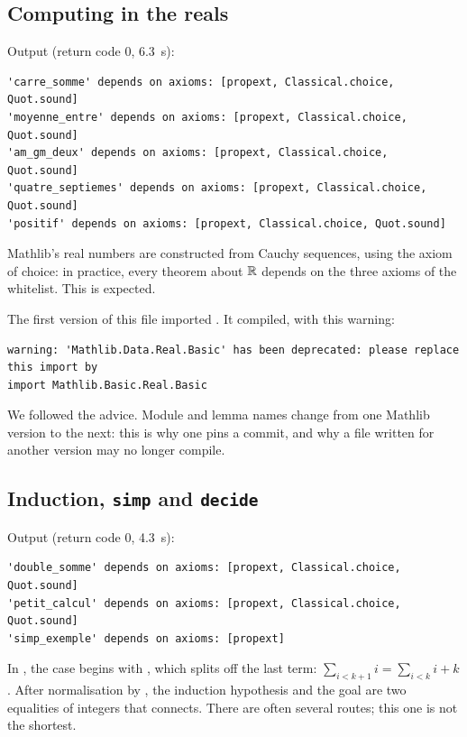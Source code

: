 \subsection{Computing in the reals}

\noindent Output (return code $0$, 6.3~s):
\begin{lstlisting}[style=appC,language={}]
'carre_somme' depends on axioms: [propext, Classical.choice, Quot.sound]
'moyenne_entre' depends on axioms: [propext, Classical.choice, Quot.sound]
'am_gm_deux' depends on axioms: [propext, Classical.choice, Quot.sound]
'quatre_septiemes' depends on axioms: [propext, Classical.choice, Quot.sound]
'positif' depends on axioms: [propext, Classical.choice, Quot.sound]
\end{lstlisting}
Mathlib's real numbers are constructed from Cauchy sequences, using the axiom of choice: in practice, every theorem about $\mathbb{R}$
depends on the three axioms of the whitelist. This is expected.

\begin{remark}\sloppy
The first version of this file imported . It compiled, with this warning:
\begin{lstlisting}[style=appC,language={}]
warning: 'Mathlib.Data.Real.Basic' has been deprecated: please replace this import by
import Mathlib.Basic.Real.Basic
\end{lstlisting}
We followed the advice. Module and lemma names change from one Mathlib version to the next: this is why one pins a
commit, and why a file written for another version may no longer compile.
\end{remark}

\subsection{Induction, \texttt{simp} and \texttt{decide}}

\noindent Output (return code $0$, 4.3~s):
\begin{lstlisting}[style=appC,language={}]
'double_somme' depends on axioms: [propext, Classical.choice, Quot.sound]
'petit_calcul' depends on axioms: [propext, Classical.choice, Quot.sound]
'simp_exemple' depends on axioms: [propext]
\end{lstlisting}
In , the case  begins with , which splits off the last term:
$\sum_{i<k+1}i=\sum_{i<k}i+k$. After normalisation by , the induction hypothesis  and the goal
are two equalities of integers that  connects. There are often several routes; this one is not the
shortest.

